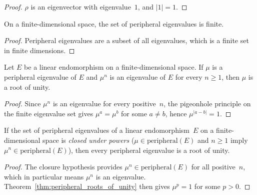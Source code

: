 \begin{proof}\leanok
    $\rho$ is an eigenvector with eigenvalue~$1$, and $|1|=1$.
\end{proof}

\begin{theorem}\label{thm:peripheral_finite}
    \leanok
    On a finite-dimensional space, the set of peripheral eigenvalues
    is finite.
\end{theorem}

\begin{proof}\leanok
    Peripheral eigenvalues are a subset of all eigenvalues,
    which is a finite set in finite dimensions.
\end{proof}

\begin{theorem}\label{thm:peripheral_roots_of_unity}
    \leanok
    Let $E$ be a linear endomorphism on a finite-dimensional space.
    If $\mu$ is a peripheral eigenvalue of $E$ and $\mu^n$ is an eigenvalue
    of $E$ for every $n\geq1$, then $\mu$ is a root of unity.
\end{theorem}

\begin{proof}
    \leanok
    Since $\mu^n$ is an eigenvalue for every positive~$n$,
    the pigeonhole principle on the finite eigenvalue set gives
    $\mu^a=\mu^b$ for some $a\neq b$, hence $\mu^{|a-b|}=1$.
\end{proof}

\begin{theorem}\label{thm:peripheral_powers}
    \leanok
    If the set of peripheral eigenvalues of a linear endomorphism~$E$ on a
    finite-dimensional space is \emph{closed under powers}
    ($\mu\in\mathrm{peripheral}(E)$ and $n\geq1$ imply
    $\mu^n\in\mathrm{peripheral}(E)$), then every peripheral eigenvalue is a
    root of unity.
\end{theorem}

\begin{proof}
    \leanok
    The closure hypothesis provides
    $\mu^n\in\mathrm{peripheral}(E)$ for all positive~$n$,
    which in particular means $\mu^n$ is an eigenvalue.
    Theorem~\ref{thm:peripheral_roots_of_unity} then gives
    $\mu^p=1$ for some $p>0$.
\end{proof}

